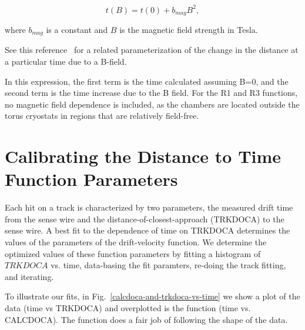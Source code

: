 \begin{equation} 
\label{eq-bmax}
t(B) = t(0) + b_{mag} B^2,
\end{equation}

\noindent
where $b_{mag}$ is a constant and $B$ is the magnetic field strength in Tesla.

See this reference~\cite{qin96} for a related
parameterization of the change in the distance at a particular time due to a
B-field. 

\noindent
In this expression, the first term is the time calculated assuming B=0, and the
second term is the time increase due to the B field.  For the R1 and R3 functions, no magnetic field 
dependence is included, as the chambers are located outside the torus 
cryostats in regions that are relatively field-free.

\section{Calibrating the Distance to Time Function Parameters}
Each hit on a track is characterized by two parameters, the measured drift 
time from the sense wire and the distance-of-closest-approach (TRKDOCA) to the 
sense wire.  A best fit to the dependence of time on TRKDOCA determines the
values of the parameters of the drift-velocity function. 
We determine the optimized values of these function parameters by fitting
a histogram of $TRKDOCA$ vs. time, data-basing the fit paramters, re-doing
the track fitting, and iterating.

To illustrate our fits, in Fig.~\ref{calcdoca-and-trkdoca-vs-time} we show a plot of
the data (time vs TRKDOCA) and overplotted is the function (time vs. CALCDOCA).
The function does a fair job of following the shape of the data.

